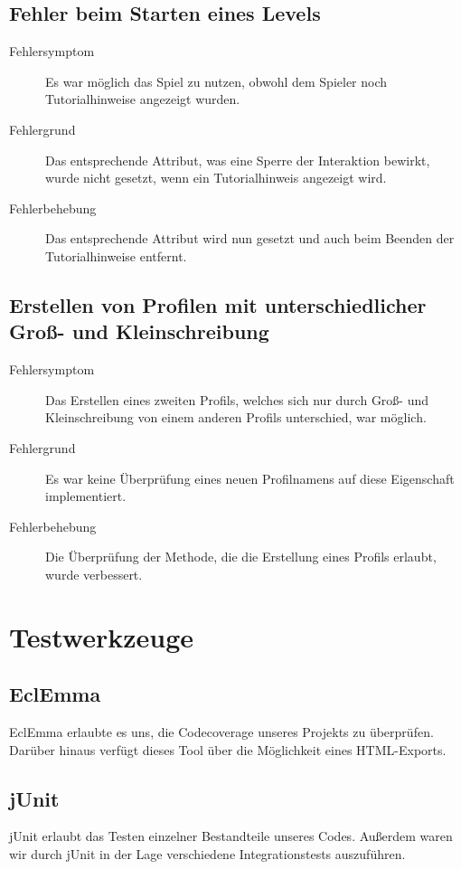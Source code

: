 \documentclass[parskip=full]{scrreprt}
\begin{document}
\section{Fehler beim Starten eines Levels}
\begin{description}
	\item[Fehlersymptom] Es war möglich das Spiel zu nutzen, obwohl dem Spieler noch Tutorialhinweise angezeigt wurden.
	\item[Fehlergrund] Das entsprechende Attribut, was eine Sperre der Interaktion bewirkt, wurde nicht gesetzt, wenn ein Tutorialhinweis angezeigt wird.
	\item[Fehlerbehebung] Das entsprechende Attribut wird nun gesetzt und auch beim Beenden der Tutorialhinweise entfernt.
\end{description}

\section{Erstellen von Profilen mit unterschiedlicher Groß- und Kleinschreibung}
\begin{description}
	\item[Fehlersymptom] Das Erstellen eines zweiten Profils, welches sich nur durch Groß- und Kleinschreibung von einem anderen Profils unterschied, war möglich.
	\item[Fehlergrund] Es war keine Überprüfung eines neuen Profilnamens auf diese Eigenschaft implementiert.
	\item[Fehlerbehebung] Die Überprüfung der Methode, die die Erstellung eines Profils erlaubt, wurde verbessert.
\end{description}

\chapter{Testwerkzeuge}

\section{EclEmma}

EclEmma erlaubte es uns, die Codecoverage unseres Projekts zu überprüfen. Darüber hinaus verfügt dieses Tool über die Möglichkeit eines HTML-Exports.

\section{jUnit}

jUnit erlaubt das Testen einzelner Bestandteile unseres Codes. Außerdem waren wir durch jUnit in der Lage verschiedene Integrationstests auszuführen.
\end{document}
